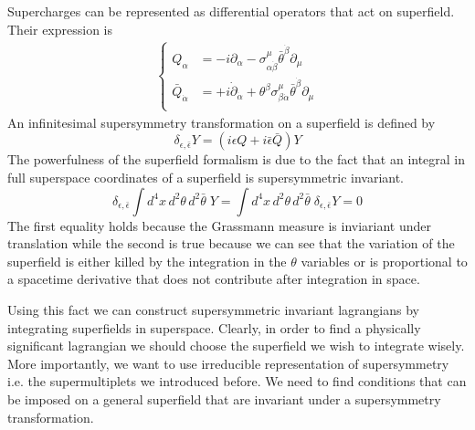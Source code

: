 \begin{appendices}
Supercharges can be represented as differential operators that act on superfield. Their expression is
\begin{align}
	\begin{cases}
		Q_{\alpha} & = - i \partial_{\alpha} - \sigma^{\mu}_{\alpha \dot{\beta}} \bar{\theta}^{\dot{\beta}} \partial_{\mu} \\
		\bar{Q}_{\dot{\alpha}} & = + i \dot{\partial}_{\dot{\alpha}} + \theta^{\beta} \sigma^{\mu}_{\beta \dot{\alpha} } \bar{\theta}^{\dot{\beta}} \partial_{\mu} \\
	\end{cases}
\end{align}
An infinitesimal supersymmetry transformation on a superfield is defined by
\begin{equation}
\delta_{\epsilon, \bar{\epsilon}} Y = \left( i \epsilon Q + i \bar{\epsilon} \bar{Q} \right) Y 
\end{equation}
The powerfulness of the superfield formalism is due to the fact that an integral in full superspace coordinates of a superfield is supersymmetric invariant.
\begin{equation}
\delta_{\epsilon, \bar{\epsilon}} \int d^4x \, d^2 \theta \, d^2 \bar{\theta} \; Y 
= \int d^4x \,  d^2 \theta \, d^2 \bar{\theta} \; \delta_{\epsilon, \bar{\epsilon}}  Y = 0  
\label{eqn:inv_superfields}
\end{equation}
The first equality holds because the Grassmann measure is inviariant under translation while the second is true because we can see that the variation of the superfield is either killed by the integration in the $\theta$ variables or is proportional to a spacetime derivative that does not contribute after integration in space. 

Using this fact we can construct supersymmetric invariant lagrangians by integrating superfields in superspace. 
Clearly, in order to find a physically significant lagrangian we should choose the superfield we wish to integrate wisely.
More importantly, we want to use irreducible representation of supersymmetry i.e. the supermultiplets we introduced before.
We need to find conditions that can be imposed on a general superfield that are invariant under a supersymmetry transformation.


\end{appendices}
